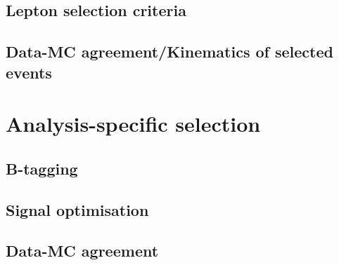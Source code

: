 \subsection{Lepton selection criteria}

\subsection{Data-MC agreement/Kinematics of selected events}

\section{Analysis-specific selection}\label{sec::SpecificSelec}
\subsection{B-tagging}

\subsection{Signal optimisation}

\subsection{Data-MC agreement}